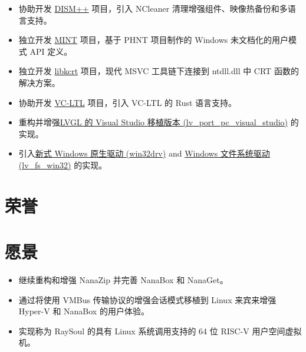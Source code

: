 \documentclass{resume}
\begin{document}
\begin{itemize}
  \item 协助开发 \href{https://github.com/Chuyu-Team/Dism-Multi-language/releases/latest}{DISM++} 项目，引入 NCleaner 清理增强组件、映像热备份和多语言支持。
  \item 独立开发 \href{https://github.com/Chuyu-Team/MINT}{MINT} 项目，基于 PHNT 项目制作的 Windows 未文档化的用户模式 API 定义。
  \item 独立开发 \href{https://github.com/Chuyu-Team/libkcrt}{libkcrt} 项目，现代 MSVC 工具链下连接到 ntdll.dll 中 CRT 函数的解决方案。
  \item 协助开发 \href{https://github.com/Chuyu-Team/VC-LTL5}{VC-LTL} 项目，引入 VC-LTL 的 Rust 语言支持。
\end{itemize}

\begin{itemize}
  \item 重构并增强\href{https://github.com/lvgl/lv_port_pc_visual_studio}{LVGL 的 Visual Studio 移植版本 (lv\_port\_pc\_visual\_studio)} 的实现。
  \item 引入\href{https://github.com/lvgl/lv_drivers/pull/117}{新式 Windows 原生驱动 (win32drv)} and \href{https://github.com/lvgl/lvgl/pull/2701}{Windows 文件系统驱动 (lv\_fs\_win32)} 的实现。
\end{itemize}

\section{荣誉}


\section{愿景}
\begin{itemize}

  \item 继续重构和增强 NanaZip 并完善 NanaBox 和 NanaGet。
  
  \item 通过将使用 VMBus 传输协议的增强会话模式移植到 Linux 来宾来增强 Hyper-V 和 NanaBox 的用户体验。
  
  \item 实现称为 RaySoul 的具有 Linux 系统调用支持的 64 位 RISC-V 用户空间虚拟机。
  
\end{itemize}
\end{document}
